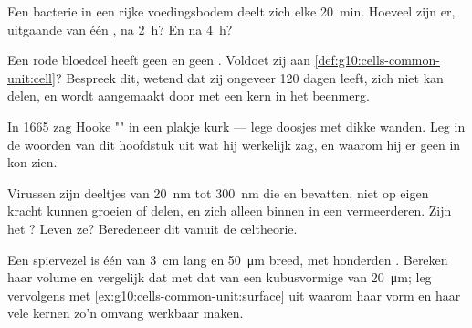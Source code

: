 \begin{exercise}[$\star\star$]\label{exo:g10:cells-common-unit:11}
Een bacterie in een rijke voedingsbodem deelt zich elke \qty{20}{min}.
Hoeveel zijn er, uitgaande van één , na \qty{2}{h}? En na \qty{4}{h}?
\end{exercise}

\begin{exercise}[$\star\star\star$]\label{exo:g10:cells-common-unit:12}
Een rode bloedcel heeft geen  en geen . Voldoet zij
aan \cref{def:g10:cells-common-unit:cell}? Bespreek dit, wetend dat zij
ongeveer 120 dagen leeft, zich niet kan delen, en wordt aangemaakt door
 met een kern in het beenmerg.
\end{exercise}

\begin{exercise}[$\star\star\star$]\label{exo:g10:cells-common-unit:13}
In 1665 zag Hooke "" in een plakje kurk --- lege doosjes met dikke
wanden. Leg in de woorden van dit hoofdstuk uit wat hij werkelijk zag,
en waarom hij er geen  in kon zien.
\end{exercise}

\begin{exercise}[$\star\star\star$]\label{exo:g10:cells-common-unit:14}
Virussen zijn deeltjes van \qty{20}{nm} tot \qty{300}{nm} die
 en  bevatten, niet op eigen kracht kunnen groeien of
delen, en zich alleen binnen in een  vermeerderen. Zijn het ?
Leven ze? Beredeneer dit vanuit de celtheorie.
\end{exercise}

\begin{exercise}[$\star\star\star$]\label{exo:g10:cells-common-unit:15}
Een spiervezel is één  van \qty{3}{cm} lang en \qty{50}{\micro m}
breed, met honderden . Bereken haar volume en vergelijk dat met
dat van een kubusvormige  van \qty{20}{\micro m}; leg vervolgens met
\cref{ex:g10:cells-common-unit:surface} uit waarom haar vorm en haar
vele kernen zo'n omvang werkbaar maken.
\end{exercise}

